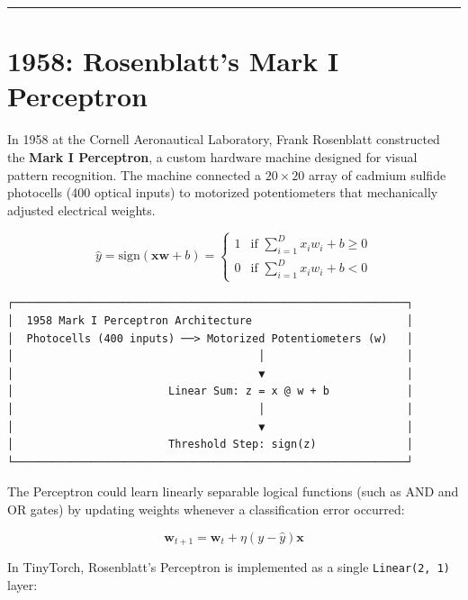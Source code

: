 \documentclass[
  letterpaper,
]{scrbook}
\begin{document}
\begin{center}\rule{0.5\linewidth}{0.5pt}\end{center}

\section*{1958: Rosenblatt's Mark I
Perceptron}\label{rosenblatts-mark-i-perceptron}


In 1958 at the Cornell Aeronautical Laboratory, Frank Rosenblatt
constructed the \textbf{Mark I Perceptron}, a custom hardware machine
designed for visual pattern recognition. The machine connected a
\(20 \times 20\) array of cadmium sulfide photocells (400 optical
inputs) to motorized potentiometers that mechanically adjusted
electrical weights.

\[\hat{y} = \text{sign}(\mathbf{x} \mathbf{w} + b) = \begin{cases} 1 & \text{if } \sum_{i=1}^D x_i w_i + b \ge 0 \\ 0 & \text{if } \sum_{i=1}^D x_i w_i + b < 0 \end{cases}\]

\begin{verbatim}
┌─────────────────────────────────────────────────────────────┐
│  1958 Mark I Perceptron Architecture                        │
│  Photocells (400 inputs) ──> Motorized Potentiometers (w)   │
│                                      │                      │
│                                      ▼                      │
│                        Linear Sum: z = x @ w + b            │
│                                      │                      │
│                                      ▼                      │
│                        Threshold Step: sign(z)              │
└─────────────────────────────────────────────────────────────┘
\end{verbatim}

The Perceptron could learn linearly separable logical functions (such as
AND and OR gates) by updating weights whenever a classification error
occurred:

\[\mathbf{w}_{t+1} = \mathbf{w}_t + \eta (y - \hat{y}) \mathbf{x}\]

In TinyTorch, Rosenblatt's Perceptron is implemented as a single
\texttt{Linear(2,\ 1)} layer:
\end{document}
